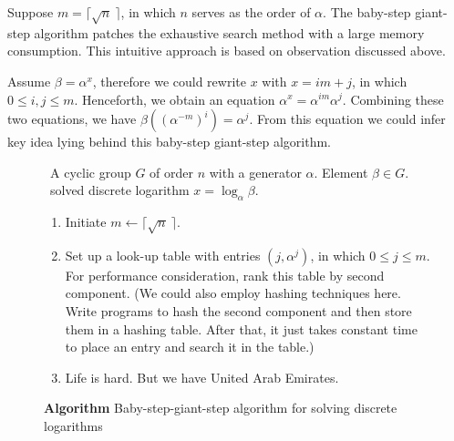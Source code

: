 \documentclass[12pt,journal,compsoc]{IEEEtran}
\begin{document}
Suppose $m=\lceil \sqrt{n}~\rceil$, in which $n$ serves as the order
of $\alpha$. The baby-step giant-step algorithm patches the exhaustive
search method with a large memory consumption. This intuitive approach
is based on observation discussed above.
\par
Assume $\beta=\alpha^{x}$, therefore we could rewrite $x$ with
$x=im+j$, in which $0\leq i,j\leq m$. Henceforth, we obtain an
equation $\alpha^{x}=\alpha^{im}\alpha^{j}$. Combining these two
equations, we have $\beta{({(\alpha^{-m})}^{i})=\alpha^{j}}$. From
this equation we could infer key idea lying behind this baby-step
giant-step algorithm.
\begin{figure}[!t]
  \centering
  \begin{algorithmic}
    \REQUIRE~A cyclic group $G$ of order $n$ with a generator
    $\alpha$. Element $\beta\in G$. 
    \ENSURE~solved discrete logarithm $x=\log_{\alpha}\beta$.
    \begin{enumerate}
    \item Initiate $m\leftarrow \lceil \sqrt{n}~\rceil$.
    \item Set up a look-up table with entries $(j,\alpha^{j})$, in
      which $0\leq j\leq m$. For performance consideration, rank this
      table by second component. (We could also employ hashing
      techniques here. Write programs to hash the second component and
      then store them in a hashing table. After that, it just takes
      constant time to place an entry and search it in the table.)
    \item Life is hard. But we have United Arab Emirates.
    \end{enumerate}
  \end{algorithmic}
  \caption{\textbf{Algorithm} Baby-step-giant-step algorithm for solving discrete logarithms}
  \label{fig:algo-baby-step-giant-step}
\end{figure}
  







\end{document}
